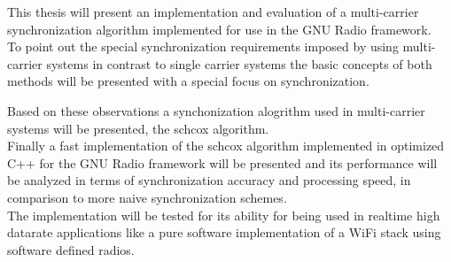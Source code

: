 This thesis will present an implementation and evaluation of a
multi-carrier synchronization algorithm implemented for use
in the GNU Radio framework. \\

To point out the special synchronization requirements
imposed by using multi-carrier systems in contrast
to single carrier systems the basic concepts of
both methods will be presented with a special focus on synchronization.

Based on these observations a synchonization alogrithm
used in multi-carrier systems will be presented,
the \gls{schcox} algorithm. \\

Finally a fast implementation of the \gls{schcox} algorithm
implemented in optimized C++ for the GNU Radio framework
will be presented and its performance will be analyzed
in terms of synchronization accuracy and processing speed,
in comparison to more naive synchronization schemes. \\

The implementation will be tested for its ability
for being used in realtime high datarate applications
like a pure software implementation of a WiFi stack using
software defined radios.
